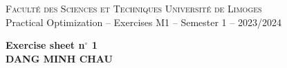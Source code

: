 \documentclass[11pt,a4paper]{article}
\begin{document}
\thispagestyle{empty}
\begin{center}

  \textsc{Facult\'e des Sciences et Techniques}  \hfill \textsc{Universit\'e de Limoges} \\
  Practical Optimization -- Exercises \hfill M1 -- Semester 1 -- 2023/2024 \\
  \bigskip

  {\bf
    \vspace{0.9cm}
    Exercise sheet n$^\circ$ 1\\
    \vspace{0.2cm}
    DANG MINH CHAU
  }
\end{center}
\bigskip

\vspace{0.5cm}


\end{document}
